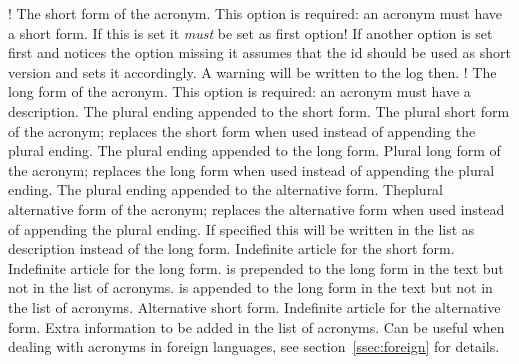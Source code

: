 \documentclass[load-preamble+]{cnltx-doc}
\begin{document}
\begin{options}
  \Default!
    The short form of the acronym.  This option is required: an acronym must
    have a short form.  If this is set it \emph{must} be set as first option!
    If another option is set first and notices the  option
    missing it assumes that the \acs{id} should be used as short version and
    sets it accordingly.  A warning will be written to the log then.
  \Default!
    The long form of the acronym.  This option is required: an acronym must
    have a description.
    The plural ending appended to the short form.
    The plural short form of the acronym; replaces the short
    form when used instead of appending the plural ending.
    The plural ending appended to the long form.
    Plural long form of the acronym; replaces the long form when used
    instead of appending the plural ending.
    The plural ending appended to the alternative form.
    Theplural alternative form of the acronym; replaces the
    alternative form when used instead of appending the plural ending.
    If specified this will be written in the list as description instead of
    the long form.
    Indefinite article for the short form.
    Indefinite article for the long form.
     is prepended to the long form in the text but not in the list
    of acronyms.
     is appended to the long form in the text but not in the list
    of acronyms.
    Alternative short form.
    Indefinite article for the alternative form.
    Extra information to be added in the list of acronyms.
    Can be useful when dealing with acronyms in foreign languages, see
    section~\vref{ssec:foreign} for details.

\end{options}
\end{document}
